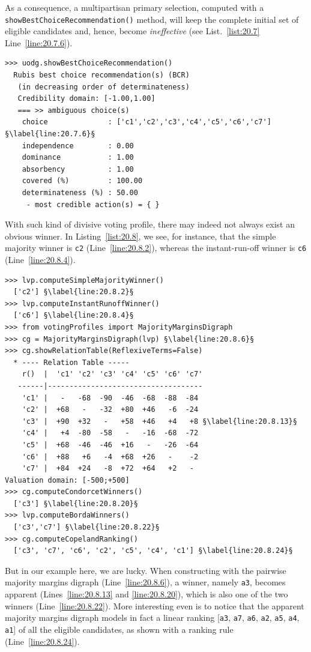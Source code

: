 As a consequence, a multipartisan primary selection, computed with a \texttt{show\-Best\-ChoiceRecommendation()} method,  will keep the complete initial set of eligible candidates and, hence, become \emph{ineffective} (see List.~\vref{list:20.7} Line~\ref{line:20.7.6}).
\begin{lstlisting}[caption={Example of ineffective primary multipartisan selection},label=list:20.7]
>>> uodg.showBestChoiceRecommendation()
  Rubis best choice recommendation(s) (BCR)
   (in decreasing order of determinateness)   
   Credibility domain: [-1.00,1.00]
   === >> ambiguous choice(s)
    choice              : ['c1','c2','c3','c4','c5','c6','c7'] §\label{line:20.7.6}§
    independence        : 0.00
    dominance           : 1.00
    absorbency          : 1.00
    covered (%)         : 100.00
    determinateness (%) : 50.00
     - most credible action(s) = { }
\end{lstlisting}

With such kind of divisive voting profile, there may indeed not always exist an obvious winner. In Listing~\vref{list:20.8}, we see, for instance, that the simple majority winner is \texttt{c2} (Line~\ref{line:20.8.2}), whereas the instant-run-off winner is \texttt{c6} (Line~\ref{line:20.8.4}).
\begin{lstlisting}[caption={Example of non obvious secondary selection},label=list:20.8]
>>> lvp.computeSimpleMajorityWinner()
  ['c2'] §\label{line:20.8.2}§
>>> lvp.computeInstantRunoffWinner()
  ['c6'] §\label{line:20.8.4}§
>>> from votingProfiles import MajorityMarginsDigraph
>>> cg = MajorityMarginsDigraph(lvp) §\label{line:20.8.6}§
>>> cg.showRelationTable(ReflexiveTerms=False)
  * ---- Relation Table -----
    r()  |  'c1' 'c2' 'c3' 'c4' 'c5' 'c6' 'c7'	  
   ------|------------------------------------
    'c1' |   -   -68  -90  -46  -68  -88  -84	 
    'c2' |  +68   -   -32  +80  +46   -6  -24	 
    'c3' |  +90  +32   -   +58  +46   +4   +8 §\label{line:20.8.13}§	 
    'c4' |   +4  -80  -58   -   -16  -68  -72	 
    'c5' |  +68  -46  -46  +16	 -   -26  -64	 
    'c6' |  +88   +6   -4  +68	+26   -    -2	 
    'c7' |  +84  +24   -8  +72	+64   +2   - 	 
Valuation domain: [-500;+500]
>>> cg.computeCondorcetWinners()
  ['c3'] §\label{line:20.8.20}§
>>> lvp.computeBordaWinners()
  ['c3','c7'] §\label{line:20.8.22}§
>>> cg.computeCopelandRanking()
  ['c3', 'c7', 'c6', 'c2', 'c5', 'c4', 'c1'] §\label{line:20.8.24}§
\end{lstlisting}

But in our example here, we are lucky. When constructing with the pairwise majority margins digraph (Line~\ref{line:20.8.6}), a \Condorcet winner, namely \texttt{a3}, becomes apparent (Lines~\ref{line:20.8.13} and \ref{line:20.8.20}), which is also one of the two \Borda winners (Line~\ref{line:20.8.22}). More interesting even is to notice that the apparent majority margins digraph models in fact a linear ranking [\texttt{a3}, \texttt{a7}, \texttt{a6}, \texttt{a2}, \texttt{a5}, \texttt{a4}, \texttt{a1}] of all the eligible candidates, as shown with a \Copeland ranking rule (Line~\ref{line:20.8.24}).

